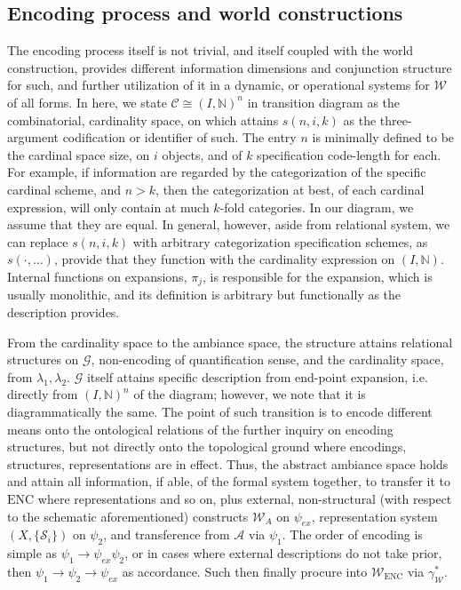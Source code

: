 \subsection{Encoding process and world constructions}

The encoding process itself is not trivial, and itself coupled with the world construction, provides different information dimensions and conjunction structure for such, and further utilization of it in a dynamic, or operational systems for $\mathcal{W}$ of all forms. In here, we state $\mathcal{C}\cong (I,\mathbb{N})^{n}$ in transition diagram as the combinatorial, cardinality space, on which attains $s(n,i,k)$ as the three-argument codification or identifier of such. The entry $n$ is minimally defined to be the cardinal space size, on $i$ objects, and of $k$ specification code-length for each. For example, if information are regarded by the categorization of the specific cardinal scheme, and $n>k$, then the categorization at best, of each cardinal expression, will only contain at much $k$-fold categories. In our diagram, we assume that they are equal. In general, however, aside from relational system, we can replace $s(n,i,k)$ with arbitrary categorization specification schemes, as $s(\cdot,\dots)$, provide that they function with the cardinality expression on $(I,\mathbb{N})$. Internal functions on expansions, $\pi_{j}$, is responsible for the expansion, which is usually monolithic, and its definition is arbitrary but functionally as the description provides. 

From the cardinality space to the ambiance space, the structure attains relational structures on $\mathcal{G}$, non-encoding of quantification sense, and the cardinality space, from $\lambda_{1},\lambda_{2}$. $\mathcal{G}$ itself attains specific description from end-point expansion, i.e. directly from $(I,\mathbb{N})^{n}$ of the diagram; however, we note that it is diagrammatically the same. The point of such transition is to encode different means onto the ontological relations of the further inquiry on encoding structures, but not directly onto the topological ground where encodings, structures, representations are in effect. Thus, the abstract ambiance space holds and attain all information, if able, of the formal system together, to transfer it to $\mathrm{ENC}$ where representations and so on, plus external, non-structural (with respect to the schematic aforementioned) constructs $\mathcal{W}_{A}$ on $\psi_{ex}$, representation system $(X,\{\mathcal{S}_{i}\})$ on $\psi_{2}$, and transference from $\mathcal{A}$ via $\psi_{1}$. The order of encoding is simple as $\psi_{1}\to \psi_{ex}\psi_{2}$, or in cases where external descriptions do not take prior, then $\psi_{1}\to\psi_{2}\to\psi_{ex}$ as accordance. Such then finally procure into $\mathcal{W}_{\mathrm{ENC}}$ via $\gamma^{*}_{\mathcal{W}}$. 


